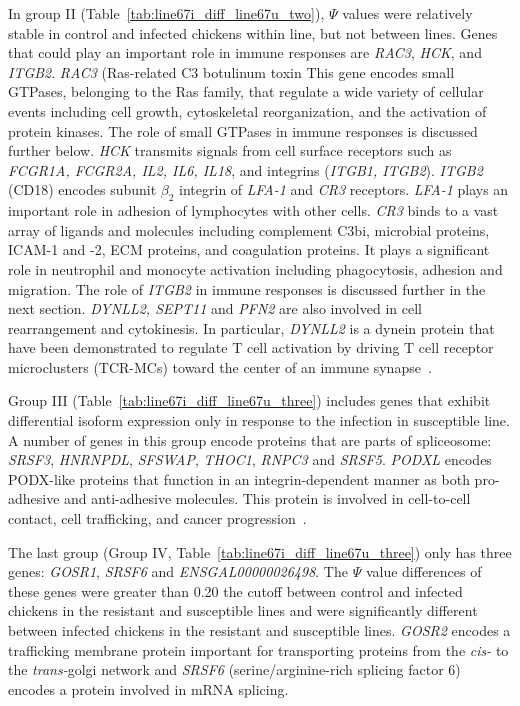 In group II (Table~\ref{tab:line67i_diff_line67u_two}), $\Psi$
values were relatively stable in control and infected chickens
within line, but not between lines.  Genes that could play an
important role in immune responses are {\em RAC3}, {\em HCK}, and
{\em ITGB2}.  {\em RAC3} (Ras-related C3 botulinum toxin This
gene encodes small GTPases, belonging to the Ras family, that
regulate a wide variety of cellular events including cell growth,
cytoskeletal reorganization, and the activation of protein
kinases.  The role of small GTPases in immune responses is
discussed further below.  {\em HCK} transmits signals from cell
surface receptors such as {\em FCGR1A, FCGR2A, IL2, IL6, IL18},
and integrins ({\em ITGB1, ITGB2}).  {\em ITGB2} (CD18) encodes
subunit $\beta_{2}$ integrin of {\em LFA-1} and {\em CR3}
receptors.  {\em LFA-1} plays an important role in adhesion of
lymphocytes with other cells.  {\em CR3} binds to a vast array of
ligands and molecules including complement C3bi, microbial
proteins, ICAM-1 and -2, ECM proteins, and coagulation proteins.
It plays a significant role in neutrophil and monocyte activation
including phagocytosis, adhesion and migration.  The role of {\em
ITGB2} in immune responses is discussed further in the next
section. {\em DYNLL2, SEPT11} and {\em PFN2} are also involved in
cell rearrangement and cytokinesis.  In particular, {\em DYNLL2}
is a dynein protein that have been demonstrated to regulate T
cell activation by driving T cell receptor microclusters
(TCR-MCs) toward the center of an immune
synapse~\cite{hashimoto2011dynein}.

Group III (Table~\ref{tab:line67i_diff_line67u_three}) includes
genes that exhibit differential isoform expression only in
response to the infection in susceptible line.  A number of genes
in this group encode proteins that are parts of spliceosome: {\em
SRSF3}, {\em HNRNPDL}, {\em SFSWAP}, {\em THOC1}, {\em RNPC3} and
{\em SRSF5}.  {\em PODXL} encodes PODX-like proteins that
function in an integrin-dependent manner as both pro-adhesive and
anti-adhesive molecules.  This protein is involved in
cell-to-cell contact, cell trafficking, and cancer
progression~\cite{nielsen2009role,somasiri2004overexpression}.

The last group (Group IV,
Table~\ref{tab:line67i_diff_line67u_three}) only has three genes:
{\em GOSR1}, {\em SRSF6} and {\em ENSGAL00000026498}.  The $\Psi$
value differences of these genes were greater than 0.20 the
cutoff between control and infected chickens in the resistant and
susceptible lines and were significantly different between
infected chickens in the resistant and susceptible lines. {\em
GOSR2} encodes a trafficking membrane protein important for
transporting proteins from the {\em cis-} to the {\em
trans-}golgi network and {\em SRSF6} (serine/arginine-rich
splicing factor 6) encodes a protein involved in mRNA splicing.

